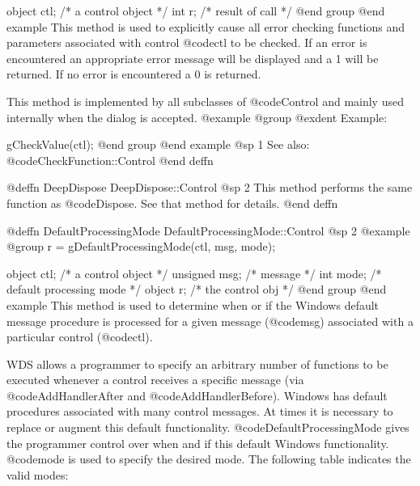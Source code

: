 object   ctl;   /*  a control object  */
int      r;     /*  result of call    */
@end group
@end example
This method is used to explicitly cause all error checking functions and
parameters associated with control @code{ctl} to be checked.  If an error
is encountered an appropriate error message will be displayed and a 1
will be returned.  If no error is encountered a 0 is returned.

This method is implemented by all subclasses of @code{Control} and mainly
used internally when the dialog is accepted.
@example
@group
@exdent Example:

gCheckValue(ctl);
@end group
@end example
@sp 1
See also:  @code{CheckFunction::Control}
@end deffn


















@deffn {DeepDispose} DeepDispose::Control
@sp 2
This method performs the same function as @code{Dispose}.  See that
method for details.
@end deffn









@deffn {DefaultProcessingMode} DefaultProcessingMode::Control
@sp 2
@example
@group
r = gDefaultProcessingMode(ctl, msg, mode);

object   ctl;   /*  a control object         */
unsigned msg;   /*  message                  */
int      mode;  /*  default processing mode  */
object   r;     /*  the control obj          */
@end group
@end example
This method is used to determine when or if the Windows default message
procedure is processed for a given message (@code{msg}) associated with
a particular control (@code{ctl}).

WDS allows a programmer to specify an arbitrary number of functions
to be executed whenever a control receives a specific message (via
@code{AddHandlerAfter} and @code{AddHandlerBefore}).  Windows has
default procedures associated with many control messages.  At times
it is necessary to replace or augment this default functionality.
@code{DefaultProcessingMode} gives the programmer control over when and
if this default Windows functionality.  @code{mode} is used to specify
the desired mode.  The following table indicates the valid modes:

